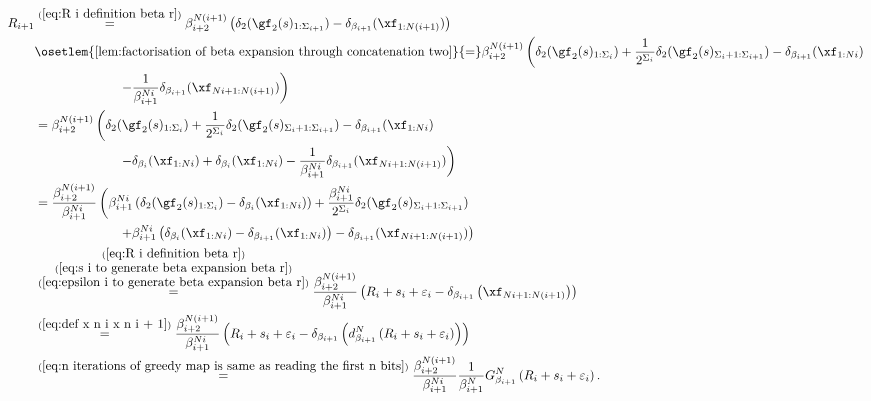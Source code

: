 \begin{align}
	R_{i+1} &\overset{(\ref{eq:R i definition beta r})}{=}\beta_{i+2}^{N(i+1)}\left(\delta_2(\gf_2(s)_{1:\Sigma_{i+1}}) - \delta_{\beta_{i+1}}(\xf_{1:N(i+1)})\right)\\
	& \osetlem{\ref{lem:factorisation of beta expansion through concatenation two}}{=} \beta_{i+2}^{N(i+1)}\left(\delta_2(\gf_2(s)_{1:\Sigma_{i}}) + \frac{1}{2^{\Sigma_i}}\delta_2(\gf_2(s)_{\Sigma_i+1:\Sigma_{i+1}}) - \delta_{\beta_{i+1}}(\xf_{1:Ni}) \right.\nonumber\\
	&  \hspace{2.3cm}\left. - \frac{1}{\beta_{i+1}^{Ni}}\delta_{\beta_{i+1}}(\xf_{Ni+1:N(i+1)}) \right)\\
	& = \beta_{i+2}^{N(i+1)}\left(\delta_2(\gf_2(s)_{1:\Sigma_{i}}) + \frac{1}{2^{\Sigma_i}}\delta_2(\gf_2(s)_{\Sigma_i+1:\Sigma_{i+1}}) - \delta_{\beta_{i+1}}(\xf_{1:Ni}) \right.\nonumber\\
	&  \hspace{2.3cm} \left. - \delta_{\beta_i}(\xf_{1:Ni}) + \delta_{\beta_i}(\xf_{1:Ni}) - \frac{1}{\beta_{i+1}^{Ni}}\delta_{\beta_{i+1}}(\xf_{Ni+1:N(i+1)}) \right)\\
	& = \frac{\beta_{i+2}^{N(i+1)}}{\beta_{i+1}^{Ni}}\left(\beta_{i+1}^{Ni}\left(\delta_2(\gf_2(s)_{1:\Sigma_{i}}) - \delta_{\beta_i}(\xf_{1:Ni})\right) + \frac{\beta_{i+1}^{Ni}}{2^{\Sigma_i}}\delta_2(\gf_2(s)_{\Sigma_i+1:\Sigma_{i+1}})  \right.\nonumber\\
	&  \hspace{2.3cm} \left. + \beta_{i+1}^{Ni}\left(\delta_{\beta_i}(\xf_{1:Ni}) - \delta_{\beta_{i+1}}(\xf_{1:Ni})\right)  - \delta_{\beta_{i+1}}(\xf_{Ni+1:N(i+1)}) \right)\\
	& \overset{\substack{(\ref{eq:R i definition beta r})\\ (\ref{eq:s i to generate beta expansion beta r})\\ (\ref{eq:epsilon i to generate beta expansion beta r})}}{=} \frac{\beta_{i+2}^{N(i+1)}}{\beta_{i+1}^{Ni}}\left(R_i + s_i + \varepsilon_i  - \delta_{\beta_{i+1}}\left(\xf_{Ni+1:N(i+1)}\right) \right)\\
	& \overset{(\ref{eq:def x n i x n i + 1})}{=} \frac{\beta_{i+2}^{N(i+1)}}{\beta_{i+1}^{Ni}}\left(R_i + s_i + \varepsilon_i  - \delta_{\beta_{i+1}}\left(d_{\beta_{i+1}}^N\left(R_i + s_i + \varepsilon_i\right)\right) \right)\\
	&\overset{(\ref{eq:n iterations of greedy map is same as reading the first n bits})}{=} \frac{\beta_{i+2}^{N(i+1)}}{\beta_{i+1}^{Ni}} \frac{1}{\beta_{i+1}^{N}} G^N_{\beta_{i+1}}\left( R_i + s_i + \varepsilon_i\right).
\end{align}
